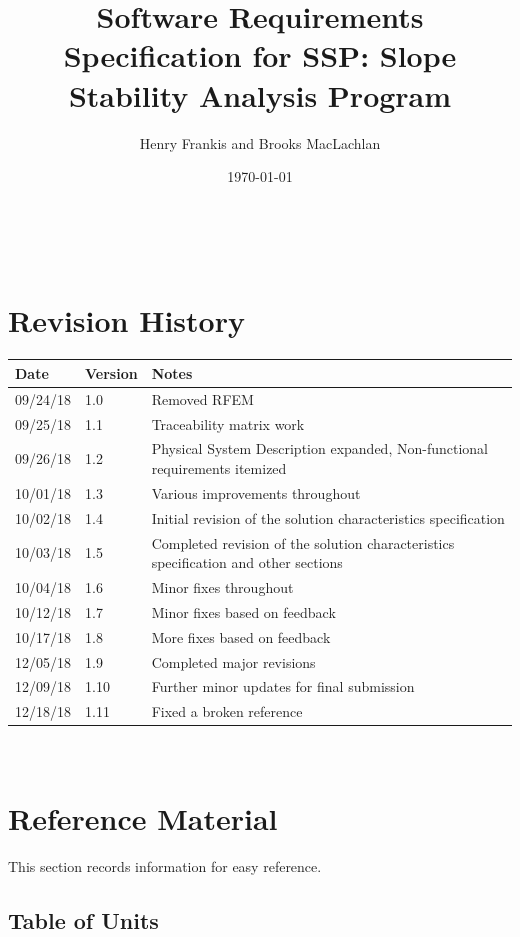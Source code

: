 \documentclass[12pt]{article}
\newcommand{\progname}{SSP}
\begin{document}
\title{Software Requirements Specification for \progname: Slope Stability
  Analysis Program}
\author{Henry Frankis and Brooks MacLachlan}
\date{\today}
	
\maketitle

~\newpage


\section{Revision History}

\begin{tabularx}{\textwidth}{p{3cm}p{2cm}X}
	\toprule {\bf Date} & {\bf Version} & {\bf Notes}\\
	\midrule
	09/24/18 & 1.0 & Removed RFEM\\
	09/25/18 & 1.1 & Traceability matrix work\\
	09/26/18 & 1.2 & Physical System Description expanded, Non-functional 
	requirements itemized\\
	10/01/18 & 1.3 & Various improvements throughout\\
	10/02/18 & 1.4 & Initial revision of the solution characteristics 
	specification\\
	10/03/18 & 1.5 & Completed revision of the solution characteristics 
	specification and other sections\\
	10/04/18 & 1.6 & Minor fixes throughout\\
	10/12/18 & 1.7 & Minor fixes based on feedback\\
	10/17/18 & 1.8 & More fixes based on feedback\\
	12/05/18 & 1.9 & Completed major revisions\\
	12/09/18 & 1.10 & Further minor updates for final submission\\
	12/18/18 & 1.11 & Fixed a broken reference\\
	\bottomrule
\end{tabularx}

~\newpage

\section{Reference Material} \label{sec_RefMat}
This section records information for easy reference.
\subsection{Table of Units}
\end{document}
